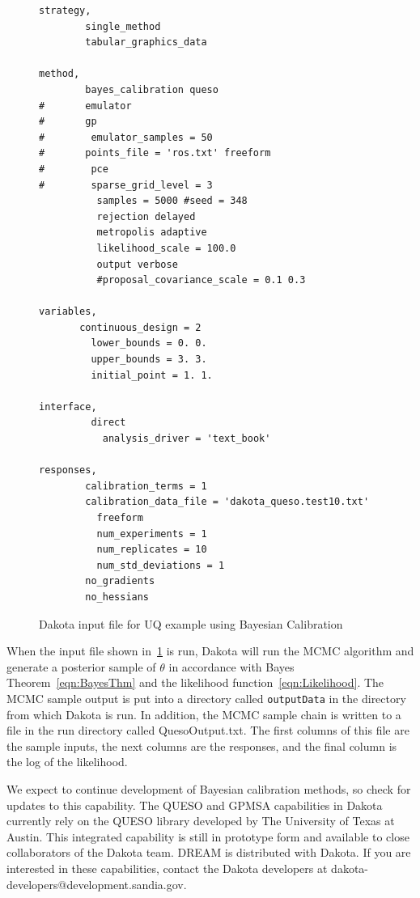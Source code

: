 \begin{figure}[htbp!]
\centering
\begin{bigbox}
\begin{small}
\begin{verbatim}
strategy,
        single_method
        tabular_graphics_data

method,
        bayes_calibration queso
#       emulator
#       gp
#        emulator_samples = 50
#       points_file = 'ros.txt' freeform
#        pce 
#        sparse_grid_level = 3 
          samples = 5000 #seed = 348                                    
          rejection delayed
          metropolis adaptive
          likelihood_scale = 100.0 
          output verbose
          #proposal_covariance_scale = 0.1 0.3
 
variables,
       continuous_design = 2
         lower_bounds = 0. 0.
         upper_bounds = 3. 3.
         initial_point = 1. 1.

interface,
         direct 
           analysis_driver = 'text_book'

responses,
        calibration_terms = 1
        calibration_data_file = 'dakota_queso.test10.txt'
          freeform
          num_experiments = 1
          num_replicates = 10 
          num_std_deviations = 1
        no_gradients
        no_hessians
\end{verbatim}
\end{small}
\end{bigbox}
\caption{Dakota input file for UQ example using Bayesian Calibration}
\label{uq:figure18}
\end{figure}

When the input file shown in~\ref{uq:figure18} is run, 
Dakota will run the MCMC algorithm and generate a posterior sample of 
$\theta$ in accordance with Bayes Theorem~\ref{eqn:BayesThm} and 
the likelihood function~\ref{eqn:Likelihood}. The MCMC sample output 
is put into a directory called \texttt{outputData} in the directory 
from which Dakota is run. In addition, the MCMC sample chain is 
written to a file in the run directory called QuesoOutput.txt. 
The first columns of this file are the sample inputs, the next columns 
are the responses, and the final column is the  log of the 
likelihood.

We expect to continue development of Bayesian calibration methods, 
so check for updates to this capability. The QUESO and GPMSA capabilities
in Dakota currently rely on the QUESO library developed by The University of 
Texas at Austin. This integrated capability is still in prototype form and 
available to close collaborators of the Dakota team.  DREAM is distributed 
with Dakota.
If you are interested in these capabilities, contact the Dakota developers at  
dakota-developers@development.sandia.gov.
  
